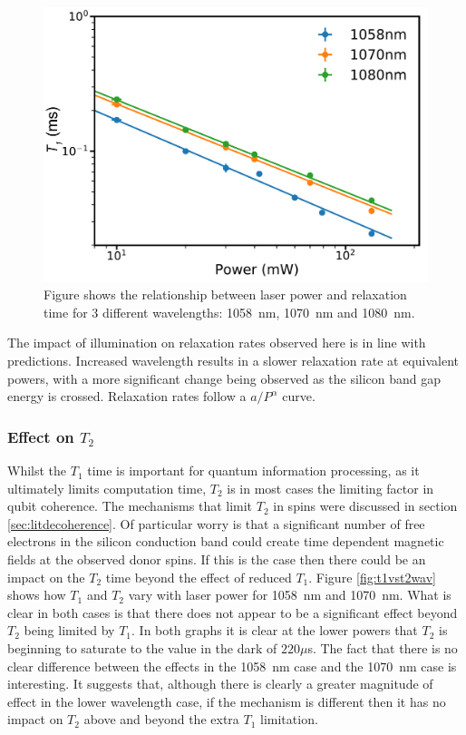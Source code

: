 \begin{figure}
\centering
\includegraphics[width = 0.8\columnwidth]{Figures/Logwavelengthcomp.pdf}
\caption[Relaxation comparison at 8~K and 1058~nm, 1070~nm, and 1080~nm illumination]{Figure shows the relationship between laser power and relaxation time for 3 different wavelengths: 1058~nm, 1070~nm and 1080~nm.}
\label{fig:wavcomparison}
\end{figure}

The impact of illumination on relaxation rates observed here is in line with predictions.
Increased wavelength results in a slower relaxation rate at equivalent powers, with a more significant change being observed as the silicon band gap energy is crossed.
Relaxation rates follow a $a/P^{\alpha}$ curve.

\subsubsection{Effect on $T_2$}

Whilst the $T_1$ time is important for quantum information processing, as it ultimately limits computation time, $T_2$ is in most cases the limiting factor in qubit coherence.
The mechanisms that limit $T_2$ in spins were discussed in section \ref{sec:litdecoherence}.
Of particular worry is that a significant number of free electrons in the silicon conduction band could create time dependent magnetic fields at the observed donor spins.
If this is the case then there could be an impact on the $T_2$ time beyond the effect of reduced $T_1$.
Figure \ref{fig:t1vst2wav} shows how $T_1$ and $T_2$ vary with laser power for 1058~nm and 1070~nm.
What is clear in both cases is that there does not appear to be a significant effect beyond $T_2$ being limited by $T_1$.
In both graphs it is clear at the lower powers that $T_2$ is beginning to saturate to the value in the dark of $220\mu$s.
The fact that there is no clear difference between the effects in the 1058~nm case and the 1070~nm case is interesting.
It suggests that, although there is clearly a greater magnitude of effect in the lower wavelength case, if the mechanism is different then it has no impact on $T_2$ above and beyond the extra $T_1$ limitation.


